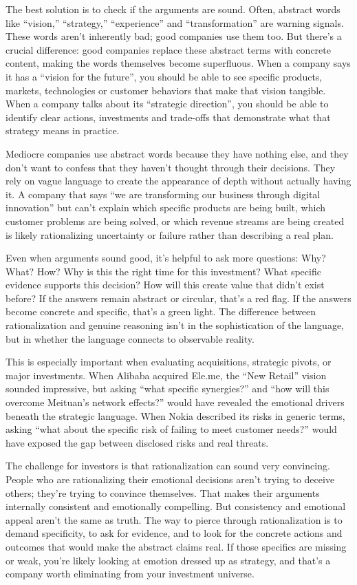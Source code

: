 The best solution is to check if the arguments are sound. Often, abstract words like ``vision,'' ``strategy,'' ``experience'' and ``transformation'' are warning signals. These words aren't inherently bad; good companies use them too. But there's a crucial difference: good companies replace these abstract terms with concrete content, making the words themselves become superfluous. When a company says it has a ``vision for the future'', you should be able to see specific products, markets, technologies or customer behaviors that make that vision tangible. When a company talks about its ``strategic direction'', you should be able to identify clear actions, investments and trade-offs that demonstrate what that strategy means in practice.

Mediocre companies use abstract words because they have nothing else, and they don't want to confess that they haven't thought through their decisions. They rely on vague language to create the appearance of depth without actually having it. A company that says ``we are transforming our business through digital innovation'' but can't explain which specific products are being built, which customer problems are being solved, or which revenue streams are being created is likely rationalizing uncertainty or failure rather than describing a real plan.

Even when arguments sound good, it's helpful to ask more questions: Why? What? How? Why is this the right time for this investment? What specific evidence supports this decision? How will this create value that didn't exist before? If the answers remain abstract or circular, that's a red flag. If the answers become concrete and specific, that's a green light. The difference between rationalization and genuine reasoning isn't in the sophistication of the language, but in whether the language connects to observable reality.

This is especially important when evaluating acquisitions, strategic pivots, or major investments. When Alibaba acquired Ele.me, the ``New Retail'' vision sounded impressive, but asking ``what specific synergies?'' and ``how will this overcome Meituan's network effects?'' would have revealed the emotional drivers beneath the strategic language. When Nokia described its risks in generic terms, asking ``what about the specific risk of failing to meet customer needs?'' would have exposed the gap between disclosed risks and real threats.

The challenge for investors is that rationalization can sound very convincing. People who are rationalizing their emotional decisions aren't trying to deceive others; they're trying to convince themselves. That makes their arguments internally consistent and emotionally compelling. But consistency and emotional appeal aren't the same as truth. The way to pierce through rationalization is to demand specificity, to ask for evidence, and to look for the concrete actions and outcomes that would make the abstract claims real. If those specifics are missing or weak, you're likely looking at emotion dressed up as strategy, and that's a company worth eliminating from your investment universe.